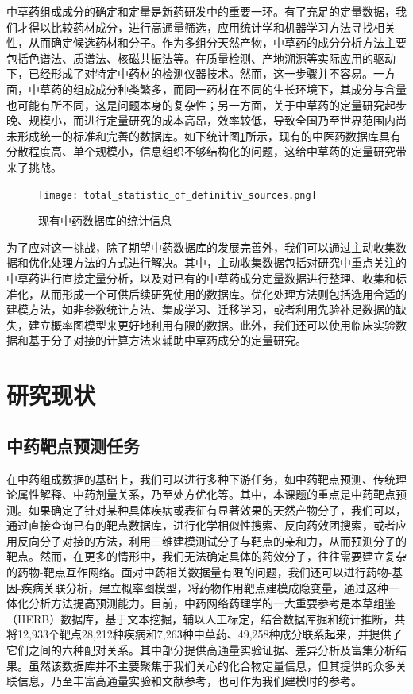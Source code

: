 中草药组成成分的确定和定量是新药研发中的重要一环。有了充足的定量数据，我们才得以比较药材成分，进行高通量筛选，应用统计学和机器学习方法寻找相关性，从而确定候选药材和分子。作为多组分天然产物，中草药的成分分析方法主要包括色谱法、质谱法、核磁共振法等\cite{中药有效部位及成分提取工艺和检测方法_2007}。在质量检测、产地溯源等实际应用的驱动下，已经形成了对特定中药材的检测仪器技术。然而，这一步骤并不容易。一方面，中草药的组成成分种类繁多，而同一药材在不同的生长环境下，其成分与含量也可能有所不同，这是问题本身的复杂性；另一方面，关于中草药的定量研究起步晚、规模小，而进行定量研究的成本高昂，效率较低，导致全国乃至世界范围内尚未形成统一的标准和完善的数据库。如下统计图\ref{fig:statistics}所示，现有的中医药数据库具有分散程度高、单个规模小，信息组织不够结构化的问题，这给中草药的定量研究带来了挑战\cite{Yang_Zhu_Yao_Chen_Chen_Gu_Jiang_Chen_Zhang_Wu_et_al._2023}。

\begin{figure}[H]
  \centering
  \texttt{[image: total\_statistic\_of\_definitiv\_sources.png]}
  \caption{现有中药数据库的统计信息}
  \label{fig:statistics}
\end{figure}


为了应对这一挑战，除了期望中药数据库的发展完善外，我们可以通过主动收集数据和优化处理方法的方式进行解决。其中，主动收集数据包括对研究中重点关注的中草药进行直接定量分析，以及对已有的中草药成分定量数据进行整理、收集和标准化，从而形成一个可供后续研究使用的数据库。优化处理方法则包括选用合适的建模方法，如非参数统计方法、集成学习、迁移学习，或者利用先验补足数据的缺失，建立概率图模型来更好地利用有限的数据。此外，我们还可以使用临床实验数据和基于分子对接的计算方法来辅助中草药成分的定量研究。

\section{研究现状}

\subsection{中药靶点预测任务}

在中药组成数据的基础上，我们可以进行多种下游任务，如中药靶点预测、传统理论属性解释、中药剂量关系，乃至处方优化等。其中，本课题的重点是中药靶点预测。如果确定了针对某种具体疾病或表征有显著效果的天然产物分子，我们可以，通过直接查询已有的靶点数据库，进行化学相似性搜索、反向药效团搜索，或者应用反向分子对接的方法，利用三维建模测试分子与靶点的亲和力，从而预测分子的靶点。\cite{Huang_Zhang_Zhou_Lin_Chen_Lin_Mai_Huang_2018}然而，在更多的情形中，我们无法确定具体的药效分子，往往需要建立复杂的药物-靶点互作网络。面对中药相关数据量有限的问题，我们还可以进行药物-基因-疾病关联分析，建立概率图模型，将药物作用靶点建模成隐变量，通过这种一体化分析方法提高预测能力。目前，中药网络药理学的一大重要参考是本草组鉴（HERB）数据库，基于文本挖掘，辅以人工标定，结合数据库掘和统计推断，共将12,933个靶点28,212种疾病和7,263种中草药、49,258种成分联系起来，并提供了它们之间的六种配对关系。其中部分提供高通量实验证据、差异分析及富集分析结果。\cite{Fang_Dong_Liu_Guo_Zhao_Zhang_Bu_Liu_Huo_Cao_et_al._2021}虽然该数据库并不主要聚焦于我们关心的化合物定量信息，但其提供的众多关联信息，乃至丰富高通量实验和文献参考，也可作为我们建模时的参考。


